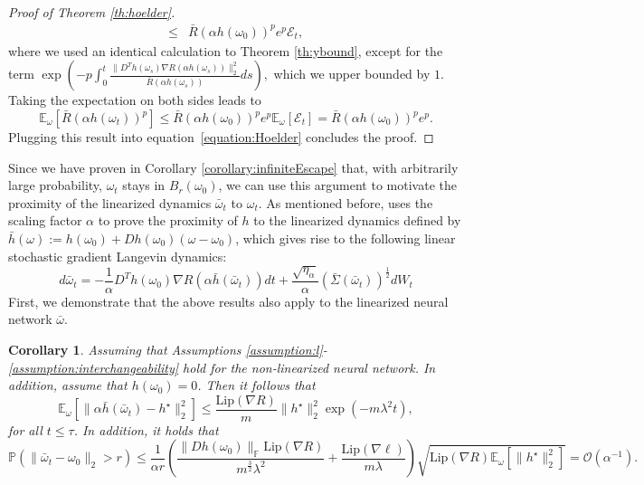 \documentclass[10pt]{article} %
\def\eqref#1{equation~\ref{#1}}
\newcommand{\bE}{\mathbb{E}}
\newcommand{\bF}{\mathbb{F}}
\newcommand{\bP}{\mathbb{P}}
\newcommand{\cE}{\mathcal{E}}
\newcommand{\cO}{\mathcal{O}}
\newcommand{\bomega}{\bar{\omega}}
\newcommand{\bh}{\bar{h}}
\newcommand{\bSigma}{\bar{\Sigma}}
\newtheorem{corollary}{Corollary}
\begin{document}
\begin{proof}[Proof of Theorem \ref{th:hoelder}]
\begin{align*}
        \leq& \bar{R}(\alpha h(\omega_0))^p e^p\cE_t,
    \end{align*}
    where we used an identical calculation to Theorem \ref{th:ybound}, except for the term 
    $\exp\left(-p\int_0^t\frac{\|D^Th(\omega_s)\nabla R(\alpha h(\omega_s))\|_2^2}{\bar{R}(\alpha h(\omega_s))}ds\right),$
    which we upper bounded by $1$. Taking the expectation on both sides leads to 
    $$\bE_\omega[\bar{R}(\alpha h(\omega_t))^p]\leq \bar{R}(\alpha h(\omega_0))^p e^p\bE_\omega[\cE_t]=\bar{R}(\alpha h(\omega_0))^p e^p.$$
    Plugging this result into \eqref{equation:Hoelder} concludes the proof.
\end{proof}
Since we have proven in Corollary \ref{corollary:infiniteEscape} that, with arbitrarily large probability, $\omega_t$ stays in $B_r(\omega_0)$, we can use this argument to motivate the proximity of the linearized dynamics $\bar{\omega}_t$ to $\omega_t$. As mentioned before, \citet{ChizatBachlazyTraining} uses the scaling factor $\alpha$ to prove the proximity of $h$ to the linearized dynamics defined by $\bar{h}(\omega):=h(\omega_0)+Dh(\omega_0)(\omega-\omega_0)$, which gives rise to the following linear stochastic gradient Langevin dynamics:
$$d\bar{\omega}_t=-\frac{1}{\alpha}D^Th(\omega_0)\nabla R(\alpha\bh(\bomega_t))dt+\frac{\sqrt{\eta_\alpha}}{\alpha}(\bSigma(\bomega_t))^\frac{1}{2}dW_t$$
First, we demonstrate that the above results also apply to the linearized neural network $\bar{\omega}$.
\begin{corollary}\label{corollary:linearizedBounds}
    Assuming that Assumptions \ref{assumption:l}-\ref{assumption:interchangeability} hold for the non-linearized neural network. In addition, assume that $h(\omega_0)=0$. Then it follows that 
    \begin{equation}\label{eq:linearizedybound}
        \bE_\omega[\|\alpha \bar{h}(\bar{\omega}_t)-h^\star\|_2^2]\leq \frac{\mathrm{Lip}(\nabla R)}{m}\|h^\star\|^2_2\exp(-m\lambda^2t),
    \end{equation}
    for all $t\leq \tau$. In addition, it holds that 
    \begin{equation*}\label{eq:linearizedomegabound}
        \bP(\|\bar{\omega}_t-\omega_0\|_2>r)\leq\frac{1}{\alpha r}\left(\frac{\|Dh(\omega_0)\|_\bF \mathrm{Lip}(\nabla R)}{m^{\frac{3}{2}}\lambda^2}+\frac{\mathrm{Lip}(\nabla \ell)}{m\lambda}{}\right)\sqrt{\mathrm{Lip}(\nabla R)\bE_\omega [\|h^\star\|^2_2]}=\cO\left(\alpha^{-1}\right).
    \end{equation*}
\end{corollary}
\end{document}
